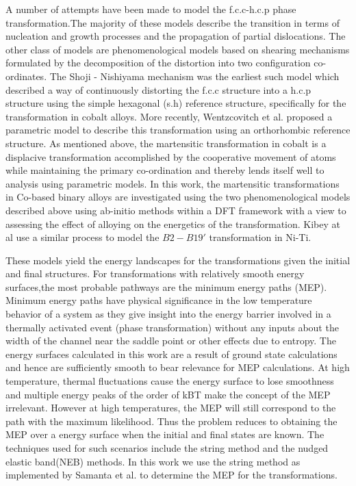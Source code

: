 \documentclass[preprint]{elsarticle}
\begin{document}
A number of attempts have been made to model the f.c.c-h.c.p phase transformation.The majority of these models describe the transition in terms of nucleation and
growth processes and the propagation of partial dislocations\cite{christian1951theory,basinski1953martensitic,bollmann1961phase}.  The other class of models are 
phenomenological models based on shearing mechanisms formulated by the decomposition of the distortion into two configuration co-ordinates. 
The Shoji - Nishiyama \cite{nishiyama1978} mechanism was the earliest such model which described a way of continuously distorting the f.c.c structure 
into a h.c.p structure using the simple hexagonal (s.h) reference structure, specifically for the transformation in cobalt alloys. More recently, Wentzcovitch et al. \cite{wentzcovitch1991fcc} proposed a parametric 
model to describe this transformation using an orthorhombic reference structure. As mentioned above, the martensitic transformation in cobalt is a displacive transformation accomplished
by the cooperative movement of atoms while maintaining the primary co-ordination and thereby lends itself well to analysis using parametric models.   In this work, the martensitic transformations in Co-based binary alloys are investigated 
using the two phenomenological models described above using ab-initio methods within a DFT framework with a view to assessing the effect of alloying on the 
energetics of the transformation. Kibey at al\cite{kibey2009} use a similar process to model the $B2-B19' $ transformation in Ni-Ti.

These models yield the energy landscapes for the transformations given the initial and final structures. For transformations with relatively smooth energy surfaces,the  most probable pathways are the minimum energy paths (MEP). Minimum energy paths have physical significance  in the low temperature behavior  of a system as they give insight into the
energy barrier involved in a thermally activated event (phase transformation)  without any inputs about  the width of the channel near the saddle point or other effects due to entropy. The energy surfaces calculated in this work are a result of ground state calculations and hence are sufficiently smooth to bear relevance for MEP calculations. 
At high temperature, thermal fluctuations cause the energy surface  to lose smoothness and multiple energy peaks of  the order of kBT  make the concept of the MEP irrelevant. However at high temperatures,  the MEP will  still correspond to the path with the maximum likelihood.
Thus the problem reduces to obtaining the MEP over a energy surface when the initial and final states are known. The techniques used for such scenarios include the string method\cite{qian2005current, samanta2010modified} and the nudged elastic band(NEB)\cite{jonsson1998nudged} methods. In this work we use the string method as implemented by Samanta et al. \cite{samanta2010modified} to determine the MEP for the transformations.
\end{document}
